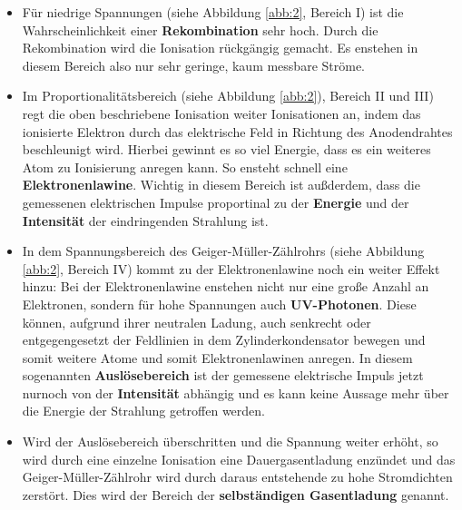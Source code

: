 \begin{itemize}
  \item Für niedrige Spannungen (siehe Abbildung \ref{abb:2}, Bereich I) ist die Wahrscheinlichkeit einer \textbf{Rekombination} sehr hoch. Durch die Rekombination
  wird die Ionisation rückgängig gemacht. Es enstehen in diesem Bereich also nur sehr geringe, kaum messbare Ströme.
  \item Im Proportionalitätsbereich (siehe Abbildung \ref{abb:2}), Bereich II und III) regt die oben beschriebene Ionisation weiter Ionisationen an, indem
  das ionisierte Elektron durch das elektrische Feld in Richtung des Anodendrahtes beschleunigt wird. Hierbei gewinnt es so viel Energie, dass
  es ein weiteres Atom zu Ionisierung anregen kann. So ensteht schnell eine \textbf{Elektronenlawine}. Wichtig in diesem Bereich ist außderdem, dass die gemessenen
  elektrischen Impulse proportinal zu der \textbf{Energie} und der \textbf{Intensität} der eindringenden Strahlung ist.
  \item In dem Spannungsbereich des Geiger-Müller-Zählrohrs (siehe Abbildung \ref{abb:2}, Bereich IV) kommt zu der Elektronenlawine noch ein weiter Effekt hinzu:
  Bei der Elektronenlawine enstehen nicht nur eine große Anzahl an Elektronen, sondern für hohe Spannungen auch \textbf{UV-Photonen}. Diese können, aufgrund ihrer
  neutralen Ladung, auch senkrecht oder entgegengesetzt der Feldlinien in dem Zylinderkondensator bewegen und somit weitere Atome und somit Elektronenlawinen anregen.
  In diesem sogenannten \textbf{Auslösebereich} ist der gemessene elektrische Impuls jetzt nurnoch von der \textbf{Intensität} abhängig und es kann keine Aussage mehr
  über die Energie der Strahlung getroffen werden.
  \item Wird der Auslösebereich überschritten und die Spannung weiter erhöht, so wird durch eine einzelne Ionisation eine Dauergasentladung enzündet und
  das Geiger-Müller-Zählrohr wird durch daraus entstehende zu hohe Stromdichten zerstört. Dies wird der Bereich der \textbf{selbständigen Gasentladung} genannt.
\end{itemize}
